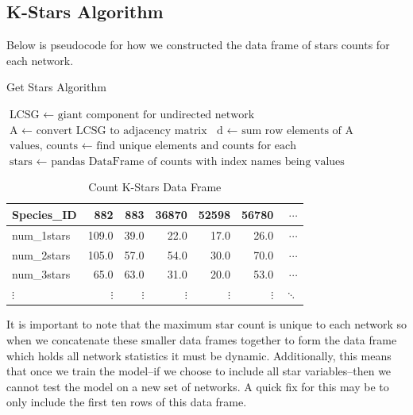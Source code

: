\documentclass[12pt]{article}
\begin{document}
\subsection{K-Stars Algorithm}
Below is pseudocode for how we constructed the data frame of stars counts for each network.
\begin{algorithm}
\caption{Get Stars Algorithm}\label{alg:cap}
\begin{algorithmic}
\State $\text{LCSG } \gets \text{ giant component for undirected network}$
\State $\text{A } \gets \text{ convert LCSG to adjacency matrix}$
\State $\text{d } \gets \text{ sum row elements of A}$
\State $\text{values, counts } \gets \text{ find unique elements and counts for each}$
\State $\text{stars } \gets \text{ pandas DataFrame of counts with index names being values}$
\end{algorithmic}
\end{algorithm}
\begin{table}[H]
\centering
\caption{Count K-Stars Data Frame}
\begin{tabular}{lrrrrrr}
\toprule
Species\_ID &  882   &  883   &  36870 &  52598 &  56780 & $\cdots$\\
\midrule
num\_1stars &  109.0 &   39.0 &   22.0 &   17.0 &   26.0 & $\cdots$\\
num\_2stars &  105.0 &   57.0 &   54.0 &   30.0 &   70.0 & $\cdots$\\
num\_3stars &   65.0 &   63.0 &   31.0 &   20.0 &   53.0 & $\cdots$\\
$\vdots$ &   $\vdots$ &   $\vdots$ &   $\vdots$ &    $\vdots$ &   $\vdots$ & $\ddots$\\
\bottomrule
\end{tabular}
\end{table}
It is important to note that the maximum star count is unique to each network so when we concatenate these smaller data frames together to form the data frame which holds all network statistics it must be dynamic. Additionally, this means that once we train the model--if we choose to include all star variables--then we cannot test the model on a new set of networks. A quick fix for this may be to only include the first ten rows of this data frame.
\end{document}

